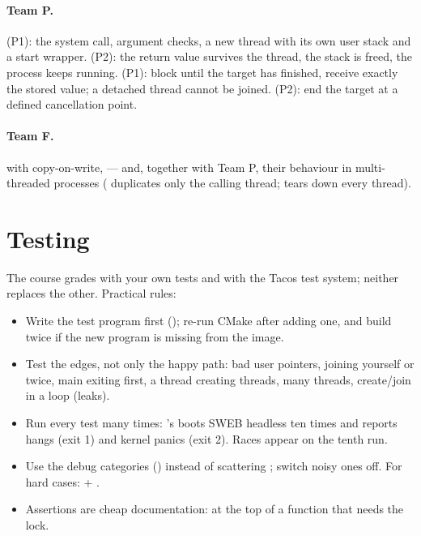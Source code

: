 \paragraph{Team P.}  (P1): the system call, argument
checks, a new thread with its own user stack and a start wrapper.
 (P2): the return value survives the thread, the
stack is freed, the process keeps running.  (P1): block
until the target has finished, receive exactly the stored value; a
detached thread cannot be joined.  (P2): end the
target at a defined cancellation point.

\paragraph{Team F.}  with copy-on-write,  --- and,
together with Team P, their behaviour in multi-threaded processes
( duplicates only the calling thread;  tears down
every thread).

\section{Testing}

The course grades with your own tests and with the Tacos test system;
neither replaces the other. Practical rules:

\begin{itemize}
  \item Write the test program first (); re-run
    CMake after adding one, and build twice if the new program is missing
    from the image.
  \item Test the edges, not only the happy path: bad user pointers,
    joining yourself or twice, main exiting first, a thread creating
    threads, many threads, create/join in a loop (leaks).
  \item Run every test many times: 's 
    boots SWEB headless ten times and reports hangs (exit 1) and kernel
    panics (exit 2). Races appear on the tenth run.
  \item Use the debug categories () instead of scattering
    ; switch noisy ones off. For hard cases:  + .
  \item Assertions are cheap documentation: 
    at the top of a function that needs the lock.
\end{itemize}


